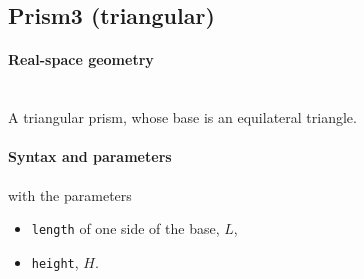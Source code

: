 \clearpage
\subsection{Prism3 (triangular)} \label{sec:Prism3}

\paragraph{Real-space geometry}\strut\\
A triangular prism, whose base is an equilateral
triangle.

\begin{figure}[h]
\hfill
{}
\hfill
{}
\hfill
{}
\hfill
\end{figure}

\FloatBarrier

\paragraph{Syntax and parameters}
\begin{quote}
\end{quote}
with the parameters
\begin{itemize}
\item \texttt{length} of one side of the base, $L$,
\item \texttt{height}, $H$.
\end{itemize}


